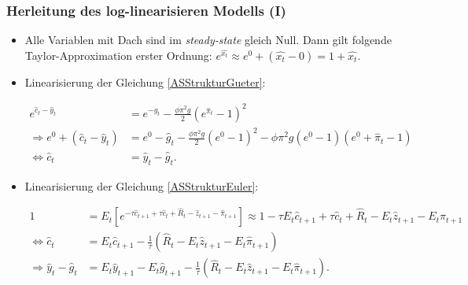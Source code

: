 \documentclass[10pt]{beamer}  %
\begin{document}
\begin{frame}\frametitle{Herleitung des log-linearisieren Modells (I)}\label{app:Loglin}
\begin{itemize}
\item Alle Variablen mit Dach sind im \emph{steady-state} gleich Null. Dann gilt folgende Taylor-Approximation erster Ordnung: $e^{\widehat{x_t}} \approx e^0 + (\widehat{x_t}-0)=1+\widehat{x_t}$.
\item Linearisierung der Gleichung \eqref{ASStrukturGueter}:
\begin{scriptsize}\begin{align*}
    e^{\widehat{c}_t-\widehat{y}_t} &= e^{-\widehat{g}_t} -\frac{\phi \pi^2 g}{2} \left(e^{\widehat{\pi}_t}-1\right)^2\\
    \Rightarrow e^0 + \left(\widehat{c}_t-\widehat{y}_t\right) &= e^0 - \widehat{g}_t - \frac{\phi \pi^2 g}{2}\left(e^0-1\right)^2 - \phi \pi^2 g \left(e^0-1\right)\left(e^0+\widehat{\pi}_t-1\right)\\
    \Leftrightarrow \widehat{c}_t &= \widehat{y}_t -\widehat{g}_t.
\end{align*}
\end{scriptsize}
\item Linearisierung der Gleichung \eqref{ASStrukturEuler}:
\begin{scriptsize}\begin{align*}
    1 &= E_t \left[e^{-\tau \widehat{c}_{t+1} +\tau \widehat{c}_t+\widehat{R}_t - \widehat{z}_{t+1} - \widehat{\pi}_{t+1}}\right]\approx 1 -\tau E_t\widehat{c}_{t+1} +\tau \widehat{c}_t+\widehat{R}_t - E_t\widehat{z}_{t+1} - E_t\widehat{\pi}_{t+1}\\
    \Leftrightarrow  \widehat{c}_t &= E_t\widehat{c}_{t+1}  - \frac{1}{\tau}(\widehat{R}_t - E_t\widehat{z}_{t+1} - E_t\widehat{\pi}_{t+1})\\
    \Rightarrow  \widehat{y}_t -\widehat{g}_t &= E_t\widehat{y}_{t+1} - E_t\widehat{g}_{t+1} - \frac{1}{\tau}(\widehat{R}_t - E_t\widehat{z}_{t+1} - E_t\widehat{\pi}_{t+1}).
\end{align*}
\end{scriptsize}
\end{itemize}
\hyperlink{Loglin}{}
\end{frame}
\end{document}
